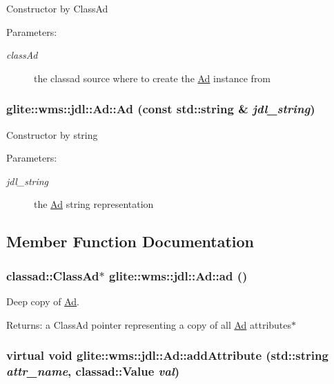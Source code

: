 Constructor by Class\-Ad \begin{Desc}
\item[Parameters:]
\begin{description}
\item[{\em class\-Ad}]the classad source where to create the \hyperlink{classglite_1_1wms_1_1jdl_1_1Ad}{Ad} instance from \end{description}
\end{Desc}
\hypertarget{classglite_1_1wms_1_1jdl_1_1Ad_z11_3}{
\subsubsection[Ad]{\setlength{\rightskip}{0pt plus 5cm}glite::wms::jdl::Ad::Ad (const std::string \& {\em jdl\_\-string})}}
\label{classglite_1_1wms_1_1jdl_1_1Ad_z11_3}


Constructor by string \begin{Desc}
\item[Parameters:]
\begin{description}
\item[{\em jdl\_\-string}]the \hyperlink{classglite_1_1wms_1_1jdl_1_1Ad}{Ad} string representation \end{description}
\end{Desc}


\subsection{Member Function Documentation}
\hypertarget{classglite_1_1wms_1_1jdl_1_1Ad_z11_4}{
\subsubsection[ad]{\setlength{\rightskip}{0pt plus 5cm}classad::Class\-Ad$\ast$ glite::wms::jdl::Ad::ad ()}}
\label{classglite_1_1wms_1_1jdl_1_1Ad_z11_4}


Deep copy of \hyperlink{classglite_1_1wms_1_1jdl_1_1Ad}{Ad}. \begin{Desc}
\item[Returns:]a Class\-Ad pointer representing a copy of all \hyperlink{classglite_1_1wms_1_1jdl_1_1Ad}{Ad} attributes$\ast$ \end{Desc}
\hypertarget{classglite_1_1wms_1_1jdl_1_1Ad_b0}{
\subsubsection[addAttribute]{\setlength{\rightskip}{0pt plus 5cm}virtual void glite::wms::jdl::Ad::add\-Attribute (std::string {\em attr\_\-name}, classad::Value {\em val})}}
\label{classglite_1_1wms_1_1jdl_1_1Ad_b0}


